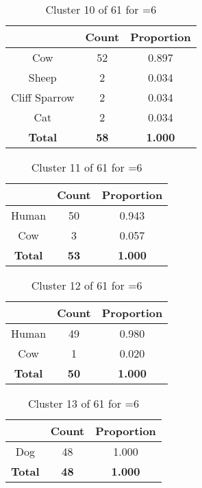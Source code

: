 \clearpage
\begin{table}[ht!]
\centering
\begin{tabular}{|c|c|c|}
\hline
\bf \Spec{} &\bf Count &\bf Proportion\\ \hline \hline
Cow & 52 & 0.897\\ \hline
Sheep & 2 & 0.034\\ \hline
Cliff Sparrow & 2 & 0.034\\ \hline
Cat & 2 & 0.034\\ \hline
\hline
\bf Total & \bf 58 & \bf 1.000\\ \hline
\end{tabular}
\label{tab:cluster:10:6}
\caption{Cluster 10 of 61 for \minneigh{}=6}
\end{table}

\begin{table}[ht!]
\centering
\begin{tabular}{|c|c|c|}
\hline
\bf \Spec{} &\bf Count &\bf Proportion\\ \hline \hline
Human & 50 & 0.943\\ \hline
Cow & 3 & 0.057\\ \hline
\hline
\bf Total & \bf 53 & \bf 1.000\\ \hline
\end{tabular}
\label{tab:cluster:11:6}
\caption{Cluster 11 of 61 for \minneigh{}=6}
\end{table}

\begin{table}[ht!]
\centering
\begin{tabular}{|c|c|c|}
\hline
\bf \Spec{} &\bf Count &\bf Proportion\\ \hline \hline
Human & 49 & 0.980\\ \hline
Cow & 1 & 0.020\\ \hline
\hline
\bf Total & \bf 50 & \bf 1.000\\ \hline
\end{tabular}
\label{tab:cluster:12:6}
\caption{Cluster 12 of 61 for \minneigh{}=6}
\end{table}

\begin{table}[ht!]
\centering
\begin{tabular}{|c|c|c|}
\hline
\bf \Spec{} &\bf Count &\bf Proportion\\ \hline \hline
Dog & 48 & 1.000\\ \hline
\hline
\bf Total & \bf 48 & \bf 1.000\\ \hline
\end{tabular}
\label{tab:cluster:13:6}
\caption{Cluster 13 of 61 for \minneigh{}=6}
\end{table}

